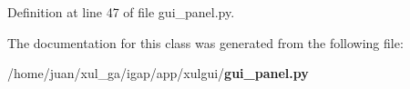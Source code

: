 \subsubsection{}\label{classapp_1_1xulgui_1_1gui__panel_1_1IndividualPanel_1ea7e9ddd56b0e7fbec44372a6e93aea}




Definition at line 47 of file gui\_\-panel.py.

The documentation for this class was generated from the following file:\begin{CompactItemize}
\item 
/home/juan/xul\_\-ga/igap/app/xulgui/{\bf gui\_\-panel.py}\end{CompactItemize}
